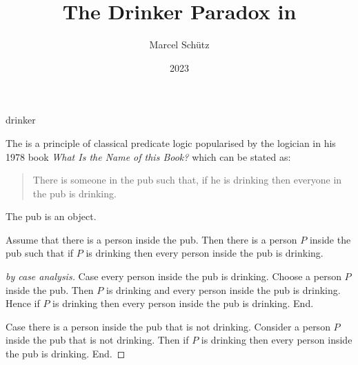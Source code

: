 \documentclass{stex}
\begin{document}
\title{The Drinker Paradox in \Naproche}
\author{Marcel Schütz}
\date{2023}
\maketitle
\begin{smodule}{drinker}
\begin{sparagraph}
  The \emph{} is a principle of classical predicate logic popularised by the logician  in his 1978 book \textit{What Is the Name of this Book?} \cite{Smullyan1978} which can be stated as:

  \begin{quotation}
    \noindent There is someone in the pub such that, if he is drinking then everyone in the pub is drinking.
  \end{quotation}
\end{sparagraph}

\begin{forthel}

  \begin{signature*}
    The pub is an object.
  \end{signature*}

  \begin{theorem*}\label{drinker_paradox}
    Assume that there is a person inside the pub.
    Then there is a person $P$ inside the pub such that if $P$ is drinking then every person inside the pub is drinking.
  \end{theorem*}
  \begin{proof}[ by case analysis]
    Case every person inside the pub is drinking.
      Choose a person $P$ inside the pub.
      Then $P$ is drinking and every person inside the pub is drinking.
      Hence if $P$ is drinking then every person inside the pub is drinking.
    End.

    Case there is a person inside the pub that is not drinking.
      Consider a person $P$ inside the pub that is not drinking.
      Then if $P$ is drinking then every person inside the pub is drinking.
    End.
  \end{proof}
\end{forthel}
\end{smodule}
\printbibliography
\end{document}

